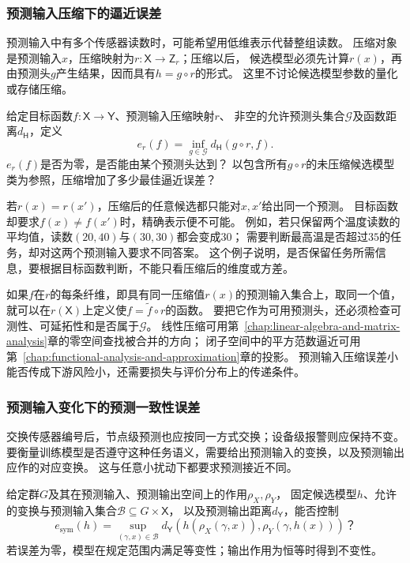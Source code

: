 \subsubsection{预测输入压缩下的逼近误差}
\label{sec:future-analysis-input-compression}

预测输入中有多个传感器读数时，可能希望用低维表示代替整组读数。
压缩对象是预测输入$x$，压缩映射为$r:\mathsf X\to\mathsf Z_r$；压缩以后，
候选模型必须先计算$r(x)$，再由预测头$g$产生结果，因而具有$h=g\circ r$的形式。
这里不讨论候选模型参数的量化或存储压缩。

\begin{mathproblem}[预测输入压缩造成的最佳逼近误差]
  \label{question:future-input-compression}
  给定目标函数$f:\mathsf X\to\mathsf Y$、预测输入压缩映射$r$、
  非空的允许预测头集合$\mathcal G$及函数距离$d_{\mathsf H}$，定义
  \[
    e_r(f)=\inf_{g\in\mathcal G}d_{\mathsf H}(g\circ r,f).
  \]
  $e_r(f)$是否为零，是否能由某个预测头达到？
  以包含所有$g\circ r$的未压缩候选模型类为参照，压缩增加了多少最佳逼近误差？
\end{mathproblem}

若$r(x)=r(x')$，压缩后的任意候选都只能对$x,x'$给出同一个预测。
目标函数却要求$f(x)\ne f(x')$时，精确表示便不可能。
例如，若只保留两个温度读数的平均值，读数$(20,40)$与$(30,30)$都会变成$30$；
需要判断最高温是否超过$35$的任务，却对这两个预测输入要求不同答案。
这个例子说明，是否保留任务所需信息，要根据目标函数判断，不能只看压缩后的维度或方差。

如果$f$在$r$的每条纤维，即具有同一压缩值$r(x)$的预测输入集合上，取同一个值，就可以在$r(\mathsf X)$上定义使$f=\widetilde f\circ r$的函数。
要把它作为可用预测头，还必须检查可测性、可延拓性和是否属于$\mathcal G$。
线性压缩可用第~\ref{chap:linear-algebra-and-matrix-analysis}章的零空间查找被合并的方向；
闭子空间中的平方范数逼近可用第~\ref{chap:functional-analysis-and-approximation}章的投影。
预测输入压缩误差小能否传成下游风险小，还需要损失与评价分布上的传递条件。

\subsubsection{预测输入变化下的预测一致性误差}
\label{sec:future-analysis-structural-property}

交换传感器编号后，节点级预测也应按同一方式交换；设备级报警则应保持不变。
要衡量训练模型是否遵守这种任务语义，需要给出预测输入的变换，以及预测输出应作的对应变换。
这与任意小扰动下都要求预测接近不同。

\begin{mathproblem}[预测输入变换与预测输出对应的误差]
  \label{question:future-structural-property}
  给定群$G$及其在预测输入、预测输出空间上的作用$\rho_X,\rho_Y$，
  固定候选模型$h$、允许的变换与预测输入集合$\mathcal B\subseteq G\times\mathsf X$，
  以及预测输出距离$d_{\mathsf Y}$，能否控制
  \[
    e_{\mathrm{sym}}(h)=\sup_{(\gamma,x)\in\mathcal B}
    d_{\mathsf Y}\!\left(h(\rho_X(\gamma,x)),\rho_Y(\gamma,h(x))\right)\text{？}
  \]
  若误差为零，模型在规定范围内满足等变性；输出作用为恒等时得到不变性。
\end{mathproblem}

